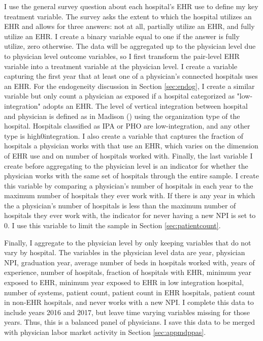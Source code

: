 \documentclass[11pt]{article}
\begin{document}
I use the general survey question about each hospital's EHR use to define my key treatment variable. The survey asks the extent to which the hospital utilizes an EHR and allows for three answers: not at all, partially utilize an EHR, and fully utilize an EHR. I create a binary variable equal to one if the answer is fully utilize, zero otherwise. The data will be aggregated up to the physician level due to physician level outcome variables, so I first transform the pair-level EHR variable into a treatment variable at the physician level. I create a variable capturing the first year that at least one of a physician's connected hospitals uses an EHR. For the endogeneity discussion in Section \ref{sec:endog}, I create a similar variable but only count a physician as exposed if a hospital categorized as "low-integration" adopts an EHR. The level of vertical integration between hospital and physician is defined as in Madison (\citeyear{madison2004hospital}) using the organization type of the hospital. Hospitals classified as IPA or PHO are low-integration, and any other type is high0integration. I also create a variable that captures the fraction of hospitals a physician works with that use an EHR, which varies on the dimension of EHR use and on number of hospitals worked with. Finally, the last variable I create before aggregating to the physician level is an indicator for whether the physician works with the same set of hospitals through the entire sample. I create this variable by comparing a physician's number of hospitals in each year to the maximum number of hospitals they ever work with. If there is any year in which the a physician's number of hospitals is less than the maximum number of hospitals they ever work with, the indicator for never having a new NPI is set to 0. I use this variable to limit the sample in Section \ref{sec:patientcount}. 

Finally, I aggregate to the physician level by only keeping variables that do not vary by hospital. The variables in the physician level data are year, physician NPI, graduation year, average number of beds in hospitals worked with, years of experience, number of hospitals, fraction of hospitals with EHR, minimum year exposed to EHR, minimum year exposed to EHR in low integration hospital, number of systems, patient count, patient count in EHR hospitals, patient count in non-EHR hospitals, and never works with a new NPI. I complete this data to include years 2016 and 2017, but leave time varying variables missing for those years. Thus, this is a balanced panel of physicians. I save this data to be merged with physician labor market activity in Section \ref{sec:appmdppas}.
\end{document}
